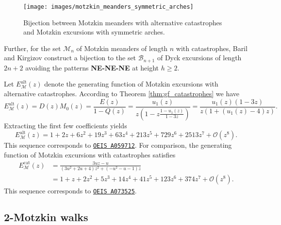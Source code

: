 \begin{figure}[hbt!]
  \centering
  \texttt{[image: images/motzkin\_meanders\_symmetric\_arches]}
  \caption[Bijection involving Motzkin meanders with alternative catastrophes and symmetric arches.]{Bijection between Motzkin meanders with alternative catastrophes and Motzkin excursions with symmetric arches.}
  \label{fig:motzkin_meanders_symmetric_arches}
\end{figure}

Further, for the set $\mathcal{M}_n$ of Motzkin meanders of length $n$ with catastrophes, Baril and Kirgizov \cite[Theorem 3]{Bijections} construct a bijection to the set $\mathcal{B}_{n+1}$ of Dyck excursions of length $2n+2$ avoiding the patterns \textbf{NE-NE-NE} at height $h \geq 2$.

\begin{example} \label{ex:motzkin_excursions}
  Let $E_\mathcal{M}^\mathrm{alt}(z)$ denote the generating function of Motzkin excursions with alternative catastrophes. According to Theorem \ref{thm:gf_catastrophes} we have 
  $$
    E_\mathcal{M}^\mathrm{alt}(z) = D(z)M_0(z) = \frac{E(z)}{1 - Q(z)} = \frac{u_1(z)}{z\left(1 - z\frac{1 - u_1(z)}{1 - 3z}\right)} = \frac{u_{1}(z)(1 - 3z)}{z(1 + (u_{1}(z) - 4)z)}.
  $$
  Extracting the first few coefficients yields 
  $$ 
    E_\mathcal{M}^\mathrm{alt}(z) = 1 + 2z + 6z^{2} + 19z^{3} + 63z^{4} + 213z^{5} + 729z^{6} + 2513z^{7} + \mathcal{O}(z^{8}).
  $$
  This sequence corresponds to \href{https://oeis.org/A059712}{\texttt{OEIS A059712}}.
  For comparison, the generating function of Motzkin excursions with catastrophes satisfies
  \begin{align*}
    E_\mathcal{M}^\mathrm{cat}(z) &= \frac{3 u z -u}{\left(3 u^{2}+2 u +4\right) z^{2}+\left(-u^{2}-u -1\right) z} \\
    &= 1 + z + 2z^2 + 5z^3 + 14z^4 + 41z^5 + 123z^6 + 374z^7 + \mathcal{O}(z^8).
  \end{align*}
  This sequence corresponds to \href{https://oeis.org/A073525}{\texttt{OEIS A073525}}.
\end{example}


\subsection{2-Motzkin walks}

